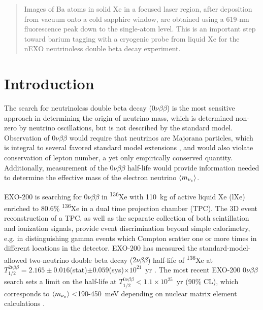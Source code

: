 \documentclass[aps,pra,reprint,superscriptaddress]{revtex4-1}
\begin{document}
\date{\today}

\begin{abstract}
Images of Ba atoms in solid Xe in a focused laser region, after deposition from vacuum onto a cold sapphire window, are obtained using a 619-nm fluorescence peak down to the single-atom level.  This is an important step toward barium tagging with a cryogenic probe from liquid Xe for the nEXO neutrinoless double beta decay experiment.

\end{abstract}


\maketitle %

\section{Introduction}

The search for neutrinoless double beta decay ($0\nu\beta\beta$) is the most sensitive approach in determining the origin of neutrino mass, which is determined non-zero by neutrino oscillations, but is not described by the standard model.  Observation of $0\nu\beta\beta$ would require that neutrinos are Majorana particles, which is integral to several favored standard model extensions \cite{ReviewNuMass}, and would also violate conservation of lepton number, a yet only empirically conserved quantity.  Additionally, measurement of the $0\nu\beta\beta$ half-life would provide information needed to determine the effective mass of the electron neutrino $\braket{m_{\nu_{e}}}$.

EXO-200 is searching for $0\nu\beta\beta$ in \textsuperscript{136}Xe with 110~kg of active liquid Xe (lXe) enriched to 80.6\% \textsuperscript{136}Xe in a dual time projection chamber (TPC).  The 3D event reconstruction of a TPC, as well as the separate collection of both scintillation and ionization signals, provide event discrimination beyond simple calorimetry, e.g. in distinguishing gamma events which Compton scatter one or more times in different locations in the detector.  EXO-200 has measured the standard-model-allowed two-neutrino double beta decay ($2\nu\beta\beta$) half-life of \textsuperscript{136}Xe at $T^{2\nu\beta\beta}_{1/2} = 2.165 \pm 0.016$(stat)$ \pm 0.059$(sys)$ \times 10^{21}$~yr \cite{EXO200TwoNuLong}.  The most recent EXO-200 $0\nu\beta\beta$ search sets a limit on the half-life at $T^{0\nu\beta\beta}_{1/2} < 1.1 \times 10^{25}$~yr (90\% CL), which corresponds to $\braket{m_{\nu_{e}}} < $190-450~meV depending on nuclear matrix element calculations \cite{EXO200ZeroNuNature}.
\end{document}
